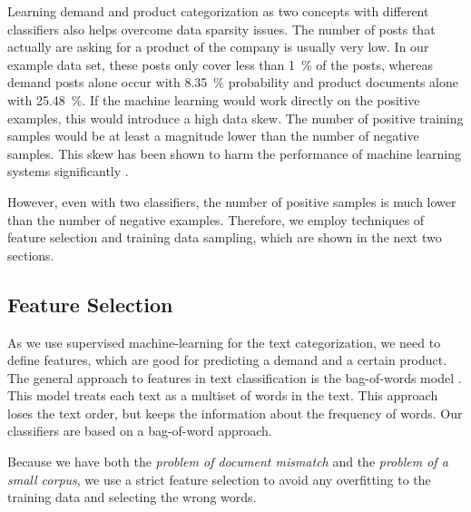 Learning demand and product categorization as two concepts with different classifiers also helps overcome data sparsity issues.
The number of posts that actually are asking for a product of the company is usually very low.
In our example data set, these posts only cover less than 1~\% of the posts, whereas demand posts alone occur with 8.35~\% probability and product documents alone with 25.48~\%.
If the machine learning would work directly on the positive examples, this would introduce a high data skew.
The number of positive training samples would be at least a magnitude lower than the number of negative samples.
This skew has been shown to harm the performance of machine learning systems significantly \cite{monard2002learning,guo2008class}.

However, even with two classifiers, the number of positive samples is much lower than the number of negative examples.
Therefore, we employ techniques of feature selection and training data sampling, which are shown in the next two sections.

\subsection{Feature Selection}
\label{sub:feature-selection}
As we use supervised machine-learning for the text categorization, we need to define features, which are good for predicting a demand and a certain product.
The general approach to features in text classification is the bag-of-words model \cite{yang1997comparative,zhang2010understanding}.
This model treats each text as a multiset of words in the text.
This approach loses the text order, but keeps the information about the frequency of words.
Our classifiers are based on a bag-of-word approach.

Because we have both the \emph{problem of document mismatch} and the \emph{problem of a small corpus}, we use a strict feature selection to avoid any overfitting to the training data and selecting the wrong words.

